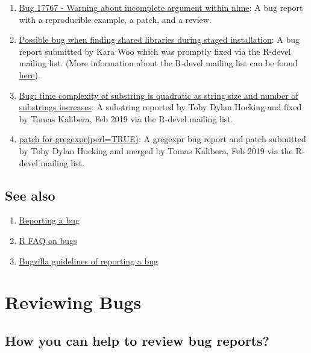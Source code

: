 \documentclass[
]{book}
\begin{document}
\begin{enumerate}
\def\labelenumi{\arabic{enumi}.}
\item
  \href{https://bugs.r-project.org/bugzilla/show_bug.cgi?id=17767}{Bug 17767 - Warning about incomplete argument within nlme}: A bug report with a reproducible example, a patch, and a review.
\item
  \href{https://stat.ethz.ch/pipermail/r-devel/2019-May/077855.html}{Possible bug when finding shared libraries during staged installation}: A bug report submitted by Kara Woo which was promptly fixed via the R-devel mailing list. (More information about the R-devel mailing list can be found \href{https://stat.ethz.ch/mailman/listinfo/r-devel}{here}).
\item
  \href{https://stat.ethz.ch/pipermail/r-devel/2019-February/077393.html}{Bug: time complexity of substring is quadratic as string size and number of substrings increases}: A substring reported by Toby Dylan Hocking and fixed by Tomas Kalibera, Feb 2019 via the R-devel mailing list.
\item
  \href{https://stat.ethz.ch/pipermail/r-devel/2019-February/077315.html}{patch for gregexpr(perl=TRUE)}: A gregexpr bug report and patch submitted by Toby Dylan Hocking and merged by Tomas Kalibera, Feb 2019 via the R-devel mailing list.
\end{enumerate}

\section{See also}\label{see-also-1}

\begin{enumerate}
\def\labelenumi{\arabic{enumi}.}
\item
  \href{https://www.r-project.org/bugs.html}{Reporting a bug}
\item
  \href{https://mac.r-project.org/man/R-FAQ.html\#R-Bugs}{R FAQ on bugs}
\item
  \href{https://bugs.r-project.org/bugzilla/page.cgi?id=bug-writing.html}{Bugzilla guidelines of reporting a bug}
\end{enumerate}

\chapter{Reviewing Bugs}\label{ReviewBugs}

\section{How you can help to review bug reports?}\label{how-you-can-help-to-review-bug-reports}
\end{document}
